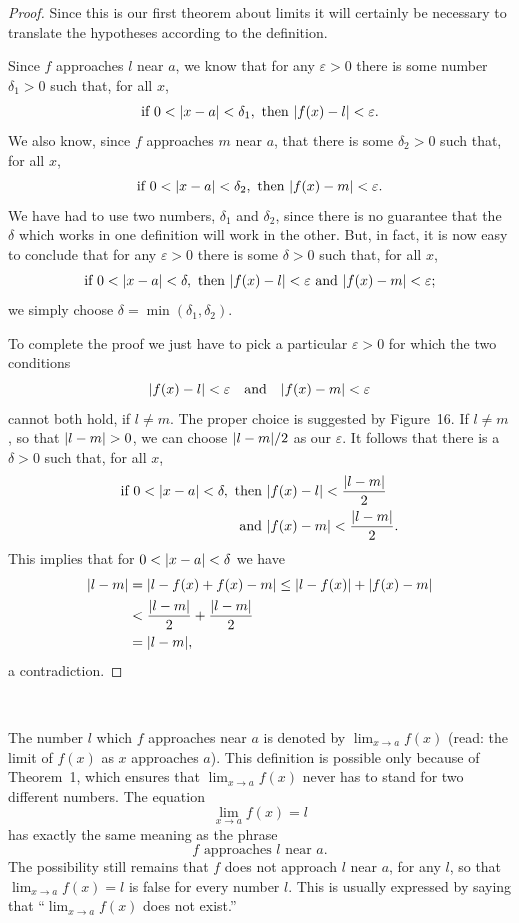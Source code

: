 \begin{proof}
Since this is our first theorem about limits it will certainly be necessary to
translate the hypotheses according to the definition.

Since $f$ approaches $l$ near $a$, we know that for any $\varepsilon>0$ there
is some number $\delta_1>0$ such that, for all $x$,
\[
\text{if }0<\lvert x-a\rvert<\delta_1,\text{ then }\lvert f(x)-l\rvert<\varepsilon.
\]
We also know, since $f$ approaches $m$ near $a$, that there is some
$\delta_2>0$ such that, for all $x$,
\[
\text{if }0<\lvert x-a\rvert<\delta_2,\text{ then }\lvert f(x)-m\rvert<\varepsilon.
\]
We have had to use two numbers, $\delta_1$ and $\delta_2$, since there is no
guarantee that the $\delta$ which works in one definition will work in the
other. But, in fact, it is now easy to conclude that for any $\varepsilon>0$
there is some $\delta>0$ such that, for all $x$,
\[
\text{if }0<\lvert x-a\rvert<\delta,\text{ then }\lvert f(x)-l\rvert<\varepsilon\text{ and }\lvert f(x)-m\rvert<\varepsilon;
\]
we simply choose $\delta=\min(\delta_1,\delta_2)$.

To complete the proof we just have to pick a particular $\varepsilon>0$ for
which the two conditions
\[
\lvert f(x)-l\rvert<\varepsilon \quad\text{and}\quad \lvert f(x)-m\rvert<\varepsilon
\]
cannot both hold, if $l\neq m$. The proper choice is suggested by Figure~16.
If $l\neq m$, so that $\lvert l-m\rvert>0$, we can choose $\lvert l-m\rvert/2$ as our
$\varepsilon$. It follows that there is a $\delta>0$ such that, for all $x$,
\begin{align*}
\text{if }0<\lvert x-a\rvert<\delta,\text{ then }&\lvert f(x)-l\rvert<\frac{\lvert l-m\rvert}{2}\\
\text{and }&\lvert f(x)-m\rvert<\frac{\lvert l-m\rvert}{2}.
\end{align*}
This implies that for $0<\lvert x-a\rvert<\delta$ we have
\begin{align*}
\lvert l-m\rvert&=\lvert l-f(x)+f(x)-m\rvert\leq\lvert l-f(x)\rvert+\lvert f(x)-m\rvert\\
&<\frac{\lvert l-m\rvert}{2}+\frac{\lvert l-m\rvert}{2}\\
&=\lvert l-m\rvert,
\end{align*}
a contradiction.
\end{proof}

\begin{center}
\\[0.6em]
\end{center}
The number $l$ which $f$ approaches near $a$ is denoted by
$\lim_{x\to a}f(x)$ (read: the limit of $f(x)$ as $x$ approaches $a$). This
definition is possible only because of Theorem~1, which ensures that
$\lim_{x\to a}f(x)$ never has to stand for two different numbers. The
equation
\[
\lim_{x\to a}f(x)=l
\]
has exactly the same meaning as the phrase
\[
\text{$f$ approaches $l$ near $a$.}
\]
The possibility still remains that $f$ does not approach $l$ near $a$, for any
$l$, so that $\lim_{x\to a}f(x)=l$ is false for every number $l$. This is
usually expressed by saying that ``$\lim_{x\to a}f(x)$ does not exist.''

